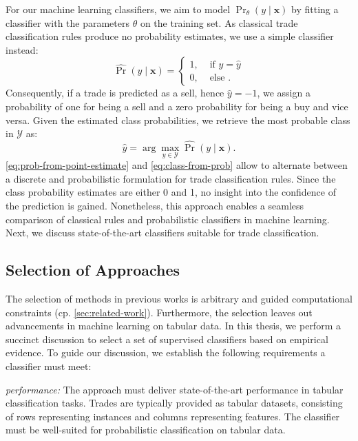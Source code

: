 For our machine learning classifiers, we aim to model $\Pr_{\theta}(y \mid \mathbf{x})$ by fitting a classifier with the parameters $\theta$ on the training set. As classical trade classification rules produce no probability estimates, we use a simple classifier instead:
\begin{equation}
    \widehat{\operatorname{Pr}}(y\mid \mathbf{x})= \begin{cases}1, & \text { if } y=\hat{y} \\ 0, & \text { else }.\end{cases}
    \label{eq:prob-from-point-estimate}
\end{equation}
Consequently, if a trade is predicted as a sell, hence $\hat{y} = -1$, we assign a probability of one for being a sell and a zero probability for being a buy and vice versa. Given the estimated class probabilities, we retrieve the most probable class in $\mathcal{Y}$ as:
\begin{equation}
    \hat{y}=\arg\max_{y \in \mathcal{Y}} \widehat{\operatorname{Pr}}(y \mid \mathbf{x}).
    \label{eq:class-from-prob}
\end{equation}
\cref{eq:prob-from-point-estimate} and \cref{eq:class-from-prob} allow to alternate between a discrete and probabilistic formulation for trade classification rules. Since the class probability estimates are either 0
and 1, no insight into the confidence of the prediction is gained. Nonetheless, this approach enables a seamless comparison of classical rules and probabilistic classifiers in machine learning. Next, we discuss state-of-the-art classifiers suitable for trade classification.

\subsection{Selection of Approaches}\label{sec:selection-of-approaches}

The selection of methods in previous works is arbitrary and guided computational constraints (cp. \cref{sec:related-work}). Furthermore, the selection leaves out advancements in machine learning on tabular data.
In this thesis, we perform a succinct discussion to select a set of supervised classifiers based on empirical evidence. To guide our discussion, we establish the following requirements a classifier must meet:


\emph{performance:} The approach must deliver state-of-the-art performance in tabular classification tasks. Trades are typically provided as tabular datasets, consisting of rows representing instances and columns representing features. The classifier must be well-suited for probabilistic classification on tabular data.


